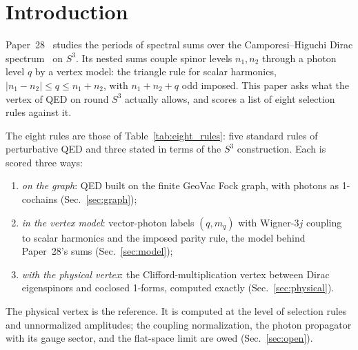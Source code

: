 \documentclass[11pt]{article}
\begin{document}
\section{Introduction}
\label{sec:intro}

Paper~28~\cite{paper28} studies the periods of spectral sums over the
Camporesi--Higuchi Dirac spectrum~\cite{camporesi1996} on $S^3$.  Its
nested sums couple spinor levels $n_1, n_2$ through a photon level $q$
by a vertex model: the triangle rule for scalar harmonics,
$|n_1 - n_2| \le q \le n_1 + n_2$, with $n_1 + n_2 + q$ odd imposed.  This
paper asks what the vertex of QED on round $S^3$ actually allows, and
scores a list of eight selection rules against it.

The eight rules are those of Table~\ref{tab:eight_rules}: five standard
rules of perturbative QED and three stated in terms of the $S^3$
construction.  Each is scored three ways:
\begin{enumerate}
\item \emph{on the graph}: QED built on the finite GeoVac Fock graph,
  with photons as 1-cochains (Sec.~\ref{sec:graph});
\item \emph{in the vertex model}: vector-photon labels $(q, m_q)$ with
  Wigner-$3j$ coupling to scalar harmonics and the imposed parity rule,
  the model behind Paper~28's sums (Sec.~\ref{sec:model});
\item \emph{with the physical vertex}: the Clifford-multiplication
  vertex between Dirac eigenspinors and coclosed 1-forms, computed
  exactly (Sec.~\ref{sec:physical}).
\end{enumerate}
The physical vertex is the reference.  It is computed at the level of
selection rules and unnormalized amplitudes; the coupling
normalization, the photon propagator with its gauge sector, and the
flat-space limit are owed (Sec.~\ref{sec:open}).
\end{document}
